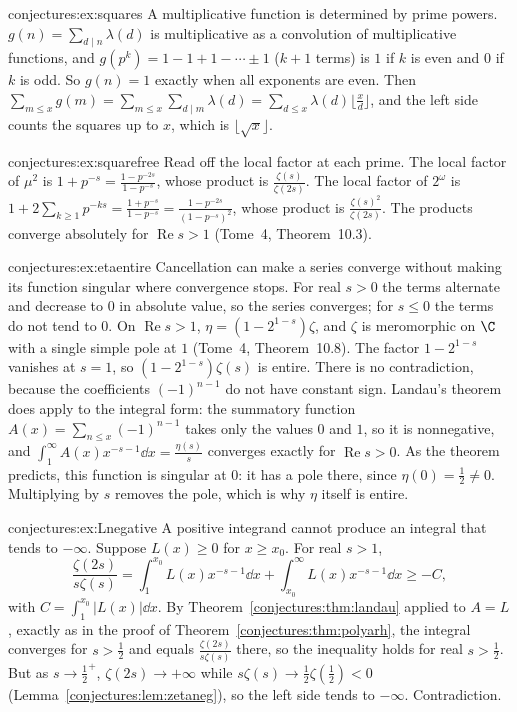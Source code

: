 \begin{solution}{conjectures:ex:squares}
\idea A multiplicative function is determined by prime powers.
\writeup $g(n)=\sum_{d\mid n}\lambda(d)$ is multiplicative as a convolution of multiplicative functions, and $g(p^k)=1-1+1-\cdots\pm1$ ($k+1$ terms) is $1$ if $k$ is
even and $0$ if $k$ is odd. So $g(n)=1$ exactly when all exponents are even. Then $\sum_{m\le x}g(m)=\sum_{m\le x}\sum_{d\mid m}\lambda(d)=\sum_{d\le x}\lambda(d)\lfloor\frac xd\rfloor$,
and the left side counts the squares up to $x$, which is $\lfloor\sqrt x\rfloor$.
\end{solution}

\begin{solution}{conjectures:ex:squarefree}
\idea Read off the local factor at each prime.
\writeup The local factor of $\mu^2$ is $1+p^{-s}=\frac{1-p^{-2s}}{1-p^{-s}}$, whose product is $\frac{\zeta(s)}{\zeta(2s)}$. The local factor of $2^\omega$ is
$1+2\sum_{k\ge1}p^{-ks}=\frac{1+p^{-s}}{1-p^{-s}}=\frac{1-p^{-2s}}{(1-p^{-s})^2}$, whose product is $\frac{\zeta(s)^2}{\zeta(2s)}$. The products converge absolutely for
$\operatorname{Re}s>1$ (Tome~4, Theorem~10.3).
\end{solution}

\begin{solution}{conjectures:ex:etaentire}
\idea Cancellation can make a series converge without making its function singular where convergence stops.
\writeup For real $s>0$ the terms alternate and decrease to $0$ in absolute value, so the series converges; for $s\le0$ the terms do not tend to $0$. On
$\operatorname{Re}s>1$, $\eta=(1-2^{1-s})\zeta$, and $\zeta$ is meromorphic on $\C$ with a single simple pole at $1$ (Tome~4, Theorem~10.8). The factor $1-2^{1-s}$
vanishes at $s=1$, so $(1-2^{1-s})\zeta(s)$ is entire. There is no contradiction, because the coefficients $(-1)^{n-1}$ do not have constant sign. Landau's theorem
does apply to the integral form: the summatory function $A(x)=\sum_{n\le x}(-1)^{n-1}$ takes only the values $0$ and $1$, so it is nonnegative, and
$\int_1^\infty A(x)x^{-s-1}\dd x=\frac{\eta(s)}s$ converges exactly for $\operatorname{Re}s>0$. As the theorem predicts, this function is singular at $0$: it has a
pole there, since $\eta(0)=\frac12\ne0$. Multiplying by $s$ removes the pole, which is why $\eta$ itself is entire.
\end{solution}

\begin{solution}{conjectures:ex:Lnegative}
\idea A positive integrand cannot produce an integral that tends to $-\infty$.
\writeup Suppose $L(x)\ge0$ for $x\ge x_0$. For real $s>1$,
\[
\frac{\zeta(2s)}{s\zeta(s)}=\int_1^{x_0}L(x)x^{-s-1}\dd x+\int_{x_0}^\infty L(x)x^{-s-1}\dd x\ge-C,
\]
with $C=\int_1^{x_0}|L(x)|\dd x$. By Theorem~\ref{conjectures:thm:landau} applied to $A=L$, exactly as in the proof of Theorem~\ref{conjectures:thm:polyarh}, the integral converges for
$s>\frac12$ and equals $\frac{\zeta(2s)}{s\zeta(s)}$ there, so the inequality holds for real $s>\frac12$. But as $s\to\frac12^+$, $\zeta(2s)\to+\infty$ while
$s\zeta(s)\to\frac12\zeta(\frac12)<0$ (Lemma~\ref{conjectures:lem:zetaneg}), so the left side tends to $-\infty$. Contradiction.
\end{solution}

